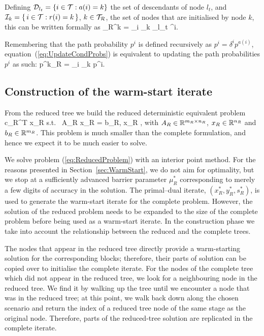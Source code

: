 Defining $\mathcal{D}_{l_t} = \{ i \in \mathcal{T} : a(i) = k \}$
the set of descendants of node $l_t$, and
$\mathcal{I}_k = \{\, i \in \mathcal{T} : r(i) = k \,\}$, $k \in \mathcal{T}_\mathcal{R}$,
the set of nodes that are initialised by node $k$,
this can be written formally as
\be  \label{eq:UpdateCondProbs}
  \delta_R^k = \sum_{i \in {}_k \cap {}_{l_t}} \delta^i.
\ee

Remembering that the path probability $p^i$ is defined recursively as
$p^i = \delta^i p^{a(i)}$, equation~(\ref{eq:UpdateCondProbs}) is equivalent 
to updating the path probabilities $p^i$ as such:
\be  \label{eq:UpdatePathProbs}
  p^k_R = \sum_{i \in {}_k} p^i.
\ee

%
%
\subsection{Construction of the warm-start iterate}
\label{sec:Construction}

From the reduced tree we build the reduced deterministic 
equivalent problem
\be \label{eq:ReducedProblem}
\min\; c_R^T x_R \;\quad \mbox{s.t. }\; A_R x_R = b_R, \; x_R ,
\ee
with $A_R \in \mathbb{R}^{m_R\times n_R}$, $x_R \in 
\mathbb{R}^{n_R}$ and $b_R \in \mathbb{R}^{m_R}$. This problem is 
much smaller than the complete formulation, and hence we expect it to 
be much easier to solve.

We solve problem (\ref{eq:ReducedProblem}) with an interior point method. 
For the reasons presented in Section~\ref{sec:WarmStart}, we do not 
aim for optimality, but we stop at a sufficiently advanced barrier 
parameter $\mu^*_R$ corresponding to merely a few digits of accuracy in the 
solution. The primal--dual iterate, $(x_R^*,y_R^*,s_R^*)$, 
is used to generate the warm-start iterate for the complete problem.
However, the solution of the reduced problem needs to be expanded to the size 
of the complete problem before being used as a warm-start iterate.
In the construction phase we take into account the relationship
between the reduced and the complete trees.

The nodes that appear in the reduced tree directly provide a warm-starting
solution for the corresponding blocks; therefore, their parts of solution
can be copied over to initialise the complete iterate.
%
For the nodes of the complete tree which did not appear in the reduced 
tree, we look for a neighbouring node in the reduced tree. We find it 
by walking up the tree until we encounter a node that was in the reduced 
tree; at this point, we walk back down along the chosen scenario and return 
the index of a reduced tree node of the same stage as the original 
node.
Therefore, parts of the reduced-tree solution are replicated in the 
complete iterate. 

